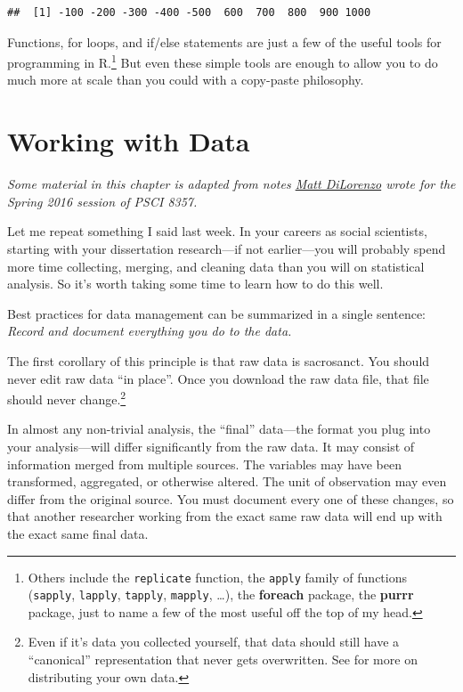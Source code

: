 \documentclass[
  12pt,
  oneside,openany]{book}
\begin{document}
\begin{verbatim}
##  [1] -100 -200 -300 -400 -500  600  700  800  900 1000
\end{verbatim}

Functions, for loops, and if/else statements are just a few of the useful tools for programming in R.\footnote{Others include the \texttt{replicate} function, the \texttt{apply} family of functions (\texttt{sapply}, \texttt{lapply}, \texttt{tapply}, \texttt{mapply}, \ldots), the \textbf{foreach} package, the \textbf{purrr} package, just to name a few of the most useful off the top of my head.} But even these simple tools are enough to allow you to do much more at scale than you could with a copy-paste philosophy.

\hypertarget{data}{%
\chapter{Working with Data}\label{data}}

\emph{Some material in this chapter is adapted from notes \href{http://mdilorenzo.github.io}{Matt DiLorenzo} wrote for the Spring 2016 session of PSCI 8357.}

Let me repeat something I said last week. In your careers as social scientists, starting with your dissertation research---if not earlier---you will probably spend more time collecting, merging, and cleaning data than you will on statistical analysis. So it's worth taking some time to learn how to do this well.

Best practices for data management can be summarized in a single sentence: \emph{Record and document everything you do to the data.}

The first corollary of this principle is that raw data is sacrosanct. You should never edit raw data ``in place''. Once you download the raw data file, that file should never change.\footnote{Even if it's data you collected yourself, that data should still have a ``canonical'' representation that never gets overwritten. See \citet{Leek:2015uw} for more on distributing your own data.}

In almost any non-trivial analysis, the ``final'' data---the format you plug into your analysis---will differ significantly from the raw data. It may consist of information merged from multiple sources. The variables may have been transformed, aggregated, or otherwise altered. The unit of observation may even differ from the original source. You must document every one of these changes, so that another researcher working from the exact same raw data will end up with the exact same final data.
\end{document}
